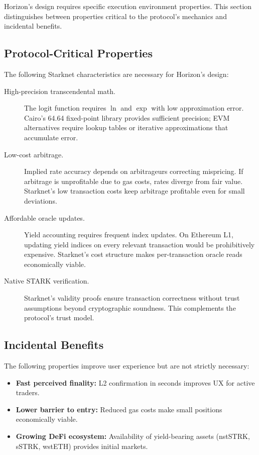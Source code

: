 Horizon's design requires specific execution environment properties. This section distinguishes between properties critical to the protocol's mechanics and incidental benefits.

\subsection{Protocol-Critical Properties}

The following Starknet characteristics are necessary for Horizon's design:

\begin{description}
\item[High-precision transcendental math.] The logit function requires $\ln$ and $\exp$ with low approximation error. Cairo's 64.64 fixed-point library provides sufficient precision; EVM alternatives require lookup tables or iterative approximations that accumulate error.

\item[Low-cost arbitrage.] Implied rate accuracy depends on arbitrageurs correcting mispricing. If arbitrage is unprofitable due to gas costs, rates diverge from fair value. Starknet's low transaction costs keep arbitrage profitable even for small deviations.

\item[Affordable oracle updates.] Yield accounting requires frequent index updates. On Ethereum L1, updating yield indices on every relevant transaction would be prohibitively expensive. Starknet's cost structure makes per-transaction oracle reads economically viable.

\item[Native STARK verification.] Starknet's validity proofs ensure transaction correctness without trust assumptions beyond cryptographic soundness. This complements the protocol's trust model.
\end{description}

\subsection{Incidental Benefits}

The following properties improve user experience but are not strictly necessary:

\begin{itemize}
\item \textbf{Fast perceived finality:} L2 confirmation in seconds improves UX for active traders.
\item \textbf{Lower barrier to entry:} Reduced gas costs make small positions economically viable.
\item \textbf{Growing DeFi ecosystem:} Availability of yield-bearing assets (nstSTRK, sSTRK, wstETH) provides initial markets.
\end{itemize}

